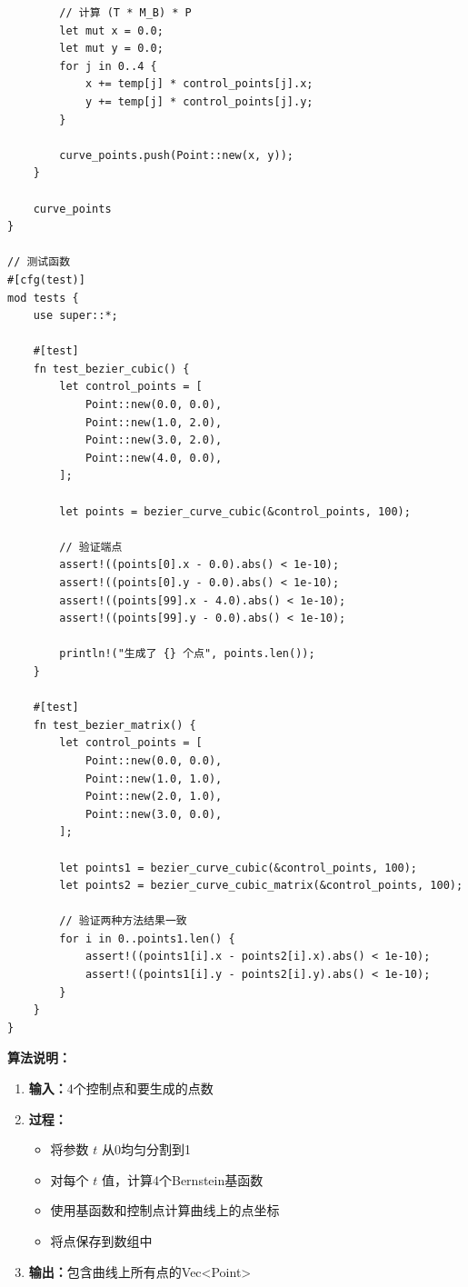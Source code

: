\documentclass[12pt,a4paper]{article}
\begin{document}
\begin{lstlisting}
        // 计算 (T * M_B) * P
        let mut x = 0.0;
        let mut y = 0.0;
        for j in 0..4 {
            x += temp[j] * control_points[j].x;
            y += temp[j] * control_points[j].y;
        }
        
        curve_points.push(Point::new(x, y));
    }
    
    curve_points
}

// 测试函数
#[cfg(test)]
mod tests {
    use super::*;
    
    #[test]
    fn test_bezier_cubic() {
        let control_points = [
            Point::new(0.0, 0.0),
            Point::new(1.0, 2.0),
            Point::new(3.0, 2.0),
            Point::new(4.0, 0.0),
        ];
        
        let points = bezier_curve_cubic(&control_points, 100);
        
        // 验证端点
        assert!((points[0].x - 0.0).abs() < 1e-10);
        assert!((points[0].y - 0.0).abs() < 1e-10);
        assert!((points[99].x - 4.0).abs() < 1e-10);
        assert!((points[99].y - 0.0).abs() < 1e-10);
        
        println!("生成了 {} 个点", points.len());
    }
    
    #[test]
    fn test_bezier_matrix() {
        let control_points = [
            Point::new(0.0, 0.0),
            Point::new(1.0, 1.0),
            Point::new(2.0, 1.0),
            Point::new(3.0, 0.0),
        ];
        
        let points1 = bezier_curve_cubic(&control_points, 100);
        let points2 = bezier_curve_cubic_matrix(&control_points, 100);
        
        // 验证两种方法结果一致
        for i in 0..points1.len() {
            assert!((points1[i].x - points2[i].x).abs() < 1e-10);
            assert!((points1[i].y - points2[i].y).abs() < 1e-10);
        }
    }
}
\end{lstlisting}

\textbf{算法说明：}

\begin{enumerate}
\item \textbf{输入：}4个控制点和要生成的点数
\item \textbf{过程：}
  \begin{itemize}
  \item 将参数 $t$ 从0均匀分割到1
  \item 对每个 $t$ 值，计算4个Bernstein基函数
  \item 使用基函数和控制点计算曲线上的点坐标
  \item 将点保存到数组中
  \end{itemize}
\item \textbf{输出：}包含曲线上所有点的Vec<Point>
\end{enumerate}
\end{document}
